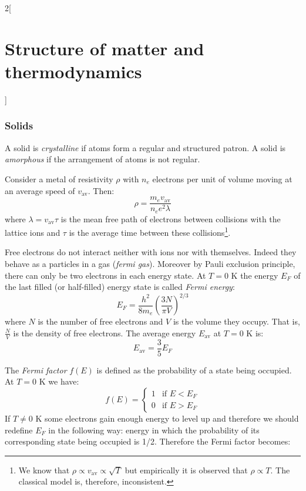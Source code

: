 \documentclass[../../../main_physics.tex]{subfiles}
\begin{document}
\begin{multicols}{2}[\section{Structure of matter and thermodynamics}]
  \subsubsection{Solids}
  \begin{definition}
    A solid is \emph{crystalline} if atoms form a regular and structured patron. A solid is \emph{amorphous} if the arrangement of atoms is not regular.
  \end{definition}
  \begin{proposition}
    Consider a metal of resistivity $\rho$ with $n_e$ electrons per unit of volume moving at an average speed of $v_\text{av}$. Then: $$\rho=\frac{m_ev_\text{av}}{n_ee^2\lambda}$$ where $\lambda=v_\text{av}\tau$ is the mean free path of electrons between collisions with the lattice ions and $\tau$ is the average time between these collisions\footnote{We know that $\rho\propto v_\text{av}\propto\sqrt{T}$ but empirically it is observed that $\rho\propto T$. The classical model is, therefore, inconsistent.}.
  \end{proposition}
  \begin{proposition}
    Free electrons do not interact neither with ions nor with themselves. Indeed they behave as a particles in a gas (\emph{fermi gas}). Moreover by Pauli exclusion principle, there can only be two electrons in each energy state. At $T=0\text{ K}$ the energy $E_F$ of the last filled (or half-filled) energy state is called \emph{Fermi energy}: $$E_F=\frac{h^2}{8m_e}{\left(\frac{3N}{\pi V}\right)}^{2/3}$$ where $N$ is the number of free electrons and $V$ is the volume they occupy. That is, $\frac{N}{V}$ is the density of free electrons. The average energy $E_\text{av}$ at $T=0\text{ K}$ is: $$E_\text{av}=\frac{3}{5}E_F$$
  \end{proposition}
  \begin{definition}
    The \emph{Fermi factor} $f(E)$ is defined as the probability of a state being occupied. At $T=0\text{ K}$ we have: $$f(E)=
      \begin{cases}
        1 & \text{if }E<E_F \\
        0 & \text{if }E>E_F
      \end{cases}
    $$
    If $T\ne 0\text{ K}$ some electrons gain enough energy to level up and therefore we should redefine $E_F$ in the following way: energy in which the probability of its corresponding state being occupied is 1/2. Therefore the Fermi factor becomes:
    \begin{center}

\end{center}
\end{definition}
\end{multicols}
\end{document}

